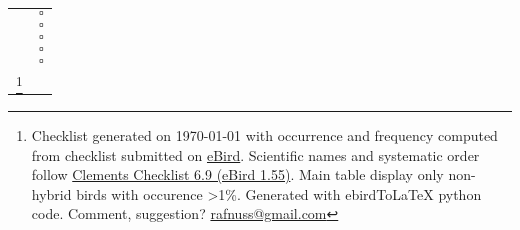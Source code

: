 \documentclass{article}
\begin{document}
\begin{center}
\begin{tabularx}{\textwidth}{cc}
\underline{\hspace{1ex}}\hspace{1ex} 	 & $\square$\hspace{1ex}  \\ 
\underline{\hspace{1ex}}\hspace{1ex} 	 & $\square$\hspace{1ex}  \\ 
\underline{\hspace{1ex}}\hspace{1ex} 	 & $\square$\hspace{1ex}  \\ 
\underline{\hspace{1ex}}\hspace{1ex} 	 & $\square$\hspace{1ex}  \\ 
\underline{\hspace{1ex}}\hspace{1ex} 	 & $\square$\hspace{1ex}  \\ 
\hline
\let\thefootnote\relax\footnote{
Checklist generated on \today{}  with occurrence and frequency computed from checklist submitted on \href{www.ebird.org}{eBird}. Scientific names and systematic order follow \href{http://www.birds.cornell.edu/clementschecklist/download/}{Clements Checklist 6.9 (eBird 1.55)}.
Main table display only non-hybrid birds with occurence >1\%.
 Generated with ebirdToLaTeX python code. Comment, suggestion? \href{mailto:rafnuss@gmail.com}{rafnuss@gmail.com}}
\end{tabularx}


\end{center}
\end{document}
